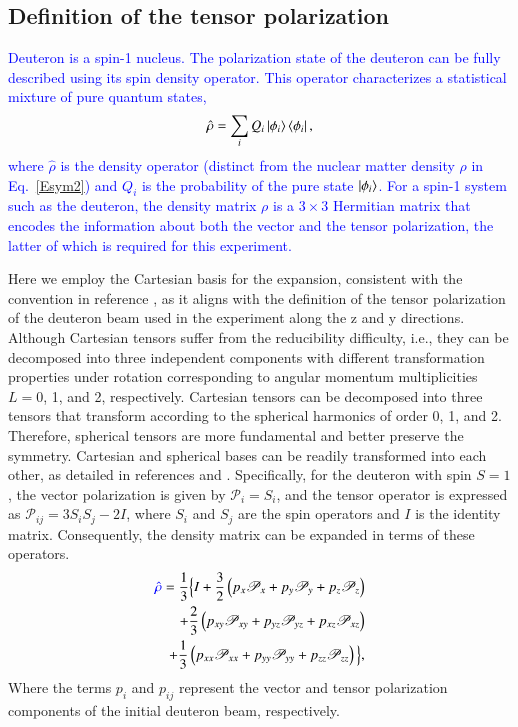 \documentclass[twocolumn,twoside,showpacs,showkeys,preprintnumbers,superscriptaddress,amsmath,amssymb,prc,nofootinbib,a4paper]{revtex4}
\begin{document}
\subsection{Definition of  the  tensor  polarization}

\textcolor{blue}{Deuteron is a spin-1 nucleus.
 The polarization state of the deuteron can be fully described using its spin density operator.
 This operator characterizes a statistical mixture of pure quantum states,
\begin{align}
\hat{\rho} = \sum_i Q_i \ket{\phi_i}\bra{\phi_i},
\end{align}
where $\hat{\rho}$ is the density operator (distinct from the nuclear matter density $\rho$ in Eq.~\ref{Esym2}) and $Q_i$ is the probability of the pure state $\ket{\phi_i}$.
 For a spin-1 system such as the deuteron, the density matrix $\rho$ is a $3 \times 3$ Hermitian matrix that encodes the information about both the vector and the tensor polarization, the latter of which is required for this experiment.}
 


Here we employ the Cartesian basis for the expansion, consistent with the convention in reference \cite{ohlsen1972polarization}, as it aligns with the definition of the tensor polarization of the deuteron beam used in the experiment along the z and y directions. Although Cartesian tensors suffer from the reducibility difficulty, i.e., they can be decomposed into three independent components with different transformation properties under rotation corresponding to angular momentum multiplicities $L=0$, 1, and 2, respectively. Cartesian tensors can be decomposed into three tensors that transform according to the spherical harmonics of order 0, 1, and 2. Therefore, spherical tensors are more fundamental and better preserve the symmetry. Cartesian and spherical bases can be readily transformed into each other, as detailed in references \cite{ohlsen1972polarization} and \cite{rose1995elementary}.  Specifically, for the deuteron with spin $S=1$, the vector polarization is given by $\mathscr{P}_i = S_i$, and the tensor operator is expressed as $\mathscr{P}_{ij}= 3 S_i S_j - 2I$, where $S_i$ and $S_j$ are the spin operators and $I$ is the identity matrix. Consequently, the density matrix can be expanded in terms of these operators.
\begin{align}
     \textcolor{blue}{\hat{\rho}} = \frac{1}{3} \Big\{
    I + \frac{3}{2} \left( p_x \mathscr{P}_x + p_y \mathscr{P}_y + p_z \mathscr{P}_z \right)  \nonumber\\  + 
     \frac{2}{3} 
    \left( 
    p_{xy} 
    \mathscr{P}_{xy} + 
    p_{yz} \mathscr{P}_{yz} + p_{xz} \mathscr{P}_{xz} 
    \right) 
 \nonumber\\ 
    + 
    \frac{1}{3} \left( p_{xx} \mathscr{P}_{xx} + p_{yy} \mathscr{P}_{yy} +p_{zz} \mathscr{P}_{zz} \right)
    \Big\},
\end{align}
Where the terms $p_i$ and $p_{ij}$ represent the vector and tensor polarization components of the initial deuteron beam, respectively.
\end{document}
